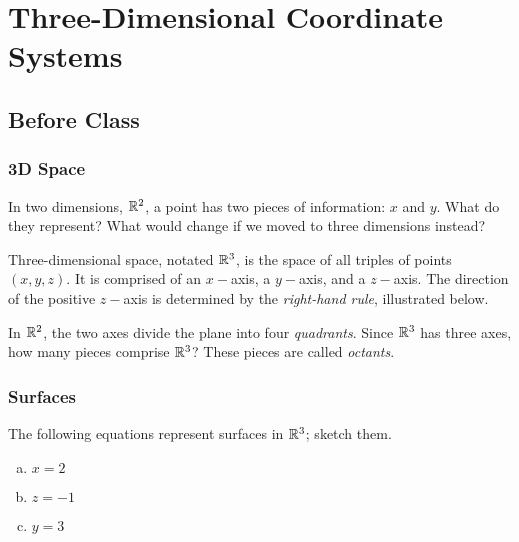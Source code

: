 \documentclass[notes]{subfiles}
\begin{document}
	\fancyhead[LO,RE]{\bfseries \small \currentname}
	\fancyfoot[C]{{}}
	\fancyfoot[RO,LE]{\large \thepage}	%
	
\section*{Three-Dimensional Coordinate Systems}\label{cs121}
	\subsection*{Before Class}
	\subsubsection*{3D Space}
		\begin{question}
			In two dimensions, $\mathbb{R}^2$, a point has two pieces of information: $x$ and $y$.  What do they represent?  What would change if we moved to three dimensions instead?
		\end{question}
			
		\begin{rmk}
			Three-dimensional space, notated $\mathbb{R}^3$, is the space of all triples of points $(x,y,z)$.  It is comprised of an $x-$axis, a $y-$axis, and a $z-$axis.  The direction of the positive $z-$axis is determined by the \emph{right-hand rule}, illustrated below.
		\end{rmk}
			
		\begin{question}
			In $\mathbb{R}^2$, the two axes divide the plane into four \emph{quadrants}.  Since $\mathbb{R}^3$ has three axes, how many pieces comprise $\mathbb{R}^3$?  These pieces are called \emph{octants}.
		\end{question}
			\newpage
			
	\subsubsection*{Surfaces}
		\begin{ex}
			The following equations represent surfaces in $\mathbb{R}^3$; sketch them.
			\begin{enumerate}[(a)]
				\item $x = 2$
					
				\item $z = -1$
					
				\item $y = 3$
					
			\end{enumerate}
		\end{ex}
		
\end{document}
